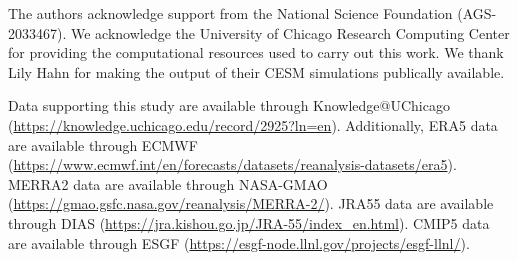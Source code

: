 \documentclass{ametsocV5}
\begin{document}
\acknowledgments
The authors acknowledge support from the National Science Foundation (AGS-2033467). We acknowledge the University of Chicago Research Computing Center for providing the computational resources used to carry out this work. We thank Lily Hahn for making the output of their CESM simulations publically available.

% 
%
\datastatement
Data supporting this study are available through Knowledge@UChicago (\url{https://knowledge.uchicago.edu/record/2925?ln=en}). Additionally, ERA5 data are available through ECMWF (\url{https://www.ecmwf.int/en/forecasts/datasets/reanalysis-datasets/era5}). MERRA2 data are available through NASA-GMAO (\url{https://gmao.gsfc.nasa.gov/reanalysis/MERRA-2/}). JRA55 data are available through DIAS (\url{https://jra.kishou.go.jp/JRA-55/index_en.html}). CMIP5 data are available through ESGF (\url{https://esgf-node.llnl.gov/projects/esgf-llnl/}). 

%




\end{document}
